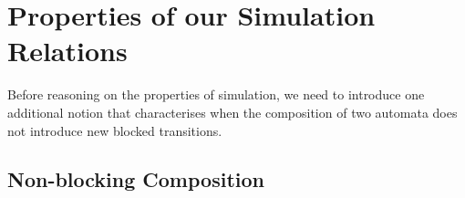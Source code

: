 \documentclass[runningheads]{llncs}
\begin{document}
\section{Properties of our Simulation Relations}\label{sec:prop}

Before reasoning on the properties of simulation, we need to introduce one additional notion that characterises when the composition of two automata does not introduce new blocked transitions.

\subsection{Non-blocking Composition}

\end{document}
